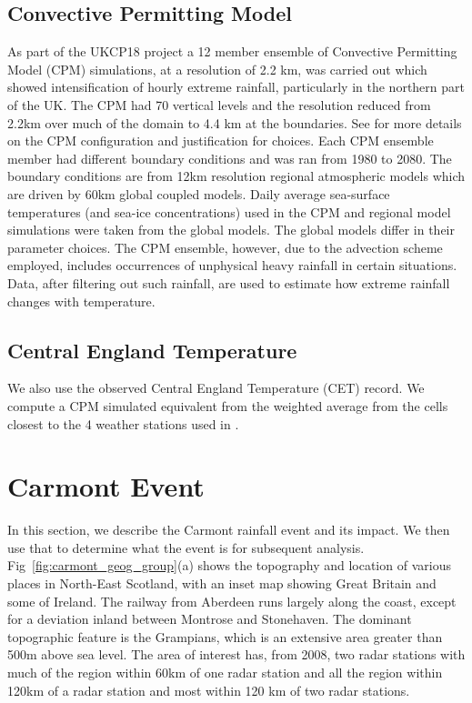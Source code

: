 \documentclass[11pt,a4paper]{article}
\begin{document}
\subsection{Convective Permitting Model}
 As part of the UKCP18 project a 12 member ensemble of Convective Permitting Model (CPM) simulations, at a resolution of 2.2 km, was carried out\parencite{kendon2023uk_cpm} which showed intensification of hourly extreme rainfall, particularly in the northern part of the UK. The CPM had 70 vertical levels and the resolution reduced from 2.2km over much of the domain to 4.4 km at the boundaries. See \cite{art:fosser20} for more details on the CPM configuration and justification for choices. Each CPM ensemble member had different boundary conditions and was ran from 1980 to 2080.  The boundary conditions  are from 12km resolution regional atmospheric models which are driven by  60km global coupled models. Daily average sea-surface temperatures (and sea-ice concentrations) used in the CPM and regional model simulations were taken from the global models. The global models differ in their parameter choices. The CPM ensemble, however, due to the advection scheme employed, includes occurrences of unphysical heavy rainfall in certain situations.  Data, after filtering out such rainfall, are used to estimate how extreme rainfall changes with temperature. 

\subsection{Central England Temperature}
We also use the observed Central England Temperature (CET) record\parencite{parker92cet}. We compute a CPM simulated equivalent from the weighted average from the cells closest to the 4 weather stations used in \cite{parker92cet}.  

\section{Carmont Event}

In this section, we describe the Carmont rainfall event and its impact. We then use that to determine what the event is for subsequent analysis. Fig~\ref{fig:carmont_geog_group}(a) shows the topography and location of various places in North-East Scotland, with an inset map showing Great Britain and some of Ireland. The railway from Aberdeen runs largely along the coast, except for a deviation inland between Montrose and Stonehaven.  The dominant topographic feature is the Grampians,  which is an extensive area greater than 500m above sea level. The area of interest has, from 2008, two radar stations with much of the region within 60km of one radar station and  all the region within 120km of a radar station and most within 120 km of two radar stations. 
\end{document}
